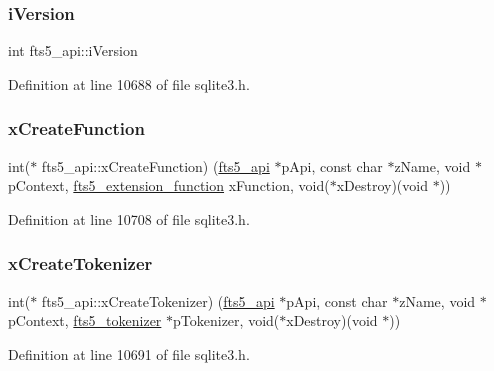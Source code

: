\subsubsection{\texorpdfstring{i\+Version}{iVersion}}
{\footnotesize\ttfamily int fts5\+\_\+api\+::i\+Version}



Definition at line 10688 of file sqlite3.\+h.

\mbox{\label{structfts5__api_acf1a0612be3b91b908f38ecbc6735d17}} 
\subsubsection{\texorpdfstring{x\+Create\+Function}{xCreateFunction}}
{\footnotesize\ttfamily int($\ast$ fts5\+\_\+api\+::x\+Create\+Function) (\mbox{\hyperlink{structfts5__api}{fts5\+\_\+api}} $\ast$p\+Api, const char $\ast$z\+Name, void $\ast$p\+Context, \mbox{\hyperlink{sqlite3_8h_a8a1df7b5a066b194f490be5936e85c17}{fts5\+\_\+extension\+\_\+function}} x\+Function, void($\ast$x\+Destroy)(void $\ast$))}



Definition at line 10708 of file sqlite3.\+h.

\mbox{\label{structfts5__api_a7fe3663f85eab512d5c461e1674da129}} 
\subsubsection{\texorpdfstring{x\+Create\+Tokenizer}{xCreateTokenizer}}
{\footnotesize\ttfamily int($\ast$ fts5\+\_\+api\+::x\+Create\+Tokenizer) (\mbox{\hyperlink{structfts5__api}{fts5\+\_\+api}} $\ast$p\+Api, const char $\ast$z\+Name, void $\ast$p\+Context, \mbox{\hyperlink{structfts5__tokenizer}{fts5\+\_\+tokenizer}} $\ast$p\+Tokenizer, void($\ast$x\+Destroy)(void $\ast$))}



Definition at line 10691 of file sqlite3.\+h.

\mbox{\label{structfts5__api_a20a23794695fa61e2892ad1243b16b67}} 
